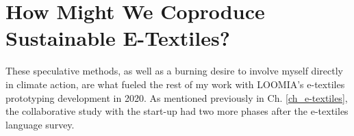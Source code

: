 \section{How Might We Coproduce Sustainable E-Textiles?}

These speculative methods, as well as a burning desire to involve myself directly in climate action, are what fueled the rest of my work with LOOMIA's e-textiles prototyping development in 2020. As mentioned previously in Ch. \ref{ch_e-textiles}, the collaborative study with the start-up had two more phases after the e-textiles language survey. 












